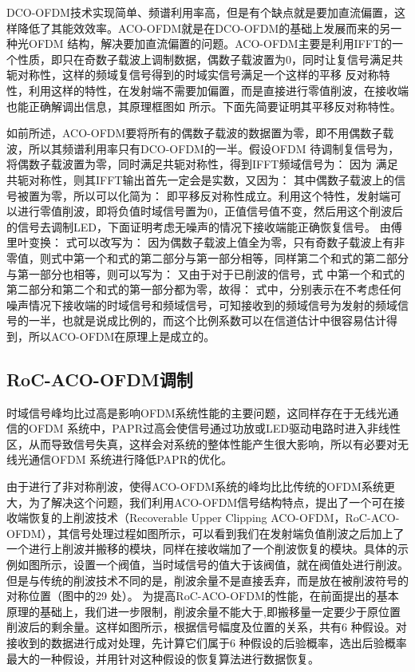 DCO-OFDM技术实现简单、频谱利用率高，但是有个缺点就是要加直流偏置，这样降低了其能效效率。ACO-OFDM就是在DCO-OFDM的基础上发展而来的另一种光OFDM 结构，解决要加直流偏置的问题。ACO-OFDM主要是利用IFFT的一个性质，即只在奇数子载波上调制数据，偶数子载波置为0，同时让复信号满足共轭对称性，这样的频域复信号得到的时域实信号满足一个这样的平移 反对称特性，利用这样的特性，在发射端不需要加偏置，而是直接进行零值削波，在接收端也能正确解调出信息，其原理框图如
 所示。下面先简要证明其平移反对称特性。

如前所述，ACO-OFDM要将所有的偶数子载波的数据置为零，即不用偶数子载波，所以其频谱利用率只有DCO-OFDM的一半。假设OFDM 待调制复信号为，将偶数子载波置为零，同时满足共轭对称性，得到IFFT频域信号为：
因为 满足共轭对称性，则其IFFT输出首先一定会是实数，又因为：
其中偶数子载波上的信号被置为零，所以可以化简为：
即平移反对称性成立。利用这个特性，发射端可以进行零值削波，即将负值时域信号置为0，正值信号值不变，然后用这个削波后的信号去调制LED，下面证明考虑无噪声的情况下接收端能正确恢复信号。
由傅里叶变换：
式可以改写为：
因为偶数子载波上值全为零，只有奇数子载波上有非零值，则式中第一个和式的第二部分与第一部分相等，同样第二个和式的第二部分与第一部分也相等，则可以写为：
又由于对于已削波的信号，式 中第一个和式的第二部分和第二个和式的第一部分都为零，故得：
式中，分别表示在不考虑任何噪声情况下接收端的时域信号和频域信号，可知接收到的频域信号为发射的频域信号的一半，也就是说成比例的，而这个比例系数可以在信道估计中很容易估计得到，所以ACO-OFDM在原理上是成立的。


\subsection{RoC-ACO-OFDM调制}
时域信号峰均比过高是影响OFDM系统性能的主要问题，这同样存在于无线光通信的OFDM 系统中，PAPR过高会使信号通过功放或LED驱动电路时进入非线性区，从而导致信号失真，这样会对系统的整体性能产生很大影响，所以有必要对无线光通信OFDM 系统进行降低PAPR的优化。

由于进行了非对称削波，使得ACO-OFDM系统的峰均比比传统的OFDM系统更大，为了解决这个问题，我们利用ACO-OFDM信号结构特点，提出了一个可在接收端恢复的上削波技术（Recoverable Upper Clipping ACO-OFDM，RoC-ACO-OFDM）\cite{xu2014aco}，其信号处理过程如图所示，可以看到我们在发射端负值削波之后加上了一个进行上削波并搬移的模块，同样在接收端加了一个削波恢复的模块。具体的示例如图所示，设置一个阀值，当时域信号的值大于该阀值，就在阀值处进行削波。但是与传统的削波技术不同的是，削波余量不是直接丢弃，而是放在被削波符号的对称位置（图中的29 处）。
为提高RoC-ACO-OFDM的性能，在前面提出的基本原理的基础上，我们进一步限制，削波余量不能大于,即搬移量一定要少于原位置削波后的剩余量。这样如图所示，根据信号幅度及位置的关系，共有6 种假设。对接收到的数据进行成对处理，先计算它们属于6 种假设的后验概率，选出后验概率最大的一种假设，并用针对这种假设的恢复算法进行数据恢复。

